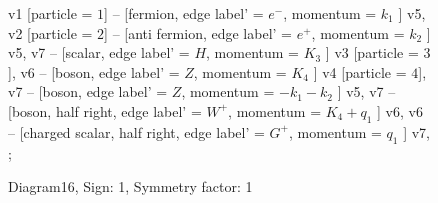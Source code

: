 \documentclass{revtex4}
\begin{document}
\begin{figure}[!htb]
\begin{center}
{    %
v1 [particle = \(1\)] -- [fermion, edge label' = \(e^{-}\), momentum = \(k_{1}\) ] v5, 
v2 [particle = \(2\)] -- [anti fermion, edge label' = \(e^{+}\), momentum = \(k_{2}\) ] v5, 
v7 -- [scalar, edge label' = \(H\), momentum = \(K_{3}\) ] v3 [particle = \(3\)], 
v6 -- [boson, edge label' = \(Z\), momentum = \(K_{4}\) ] v4 [particle = \(4\)], 
v7 -- [boson, edge label' = \(Z\), momentum = \(-k_{1} - k_{2}\) ] v5, 
v7 -- [boson, half right, edge label' = \(W^{+}\), momentum = \(K_{4} + q_{1}\) ] v6, 
v6 -- [charged scalar, half right, edge label' = \(G^{+}\), momentum = \(q_{1}\) ] v7, 
};
\end{center}
\caption{Diagram16, Sign: 1, Symmetry factor: 1}
\end{figure}
\newpage
\end{document}
